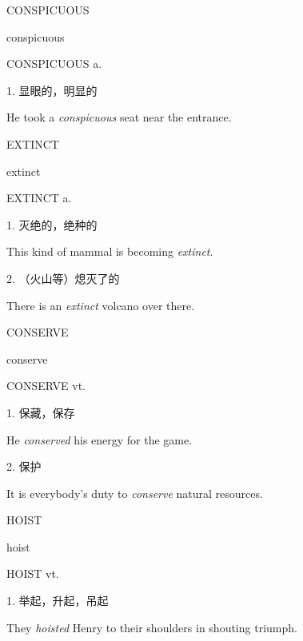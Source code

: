 \begin{flashcard}{
CONSPICUOUS

conspicuous
}
\begin{center}
CONSPICUOUS a. 
\end{center}
1. 显眼的，明显的

He took a \textit{conspicuous} seat near the entrance.

\end{flashcard}
\begin{flashcard}{
EXTINCT

extinct
}
\begin{center}
EXTINCT a. 
\end{center}
1. 灭绝的，绝种的

This kind of mammal is becoming \textit{extinct}.

2. （火山等）熄灭了的

There is an \textit{extinct} volcano over there.

\end{flashcard}
\begin{flashcard}{
CONSERVE

conserve
}
\begin{center}
CONSERVE vt. 
\end{center}
1. 保藏，保存

He \textit{conserved} his energy for the game.

2. 保护

It is everybody's duty to \textit{conserve} natural resources.

\end{flashcard}
\begin{flashcard}{
HOIST

hoist
}
\begin{center}
HOIST vt. 
\end{center}
1. 举起，升起，吊起

They \textit{hoisted} Henry to their shoulders in shouting triumph.

\end{flashcard}
